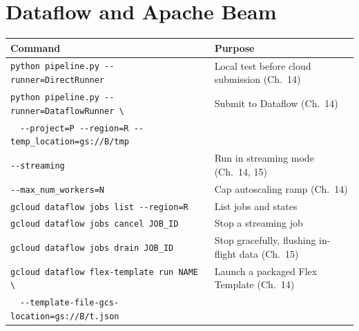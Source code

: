 \section{Dataflow and Apache Beam}
\begin{center}
\footnotesize
\begin{tabular}{@{}p{6.6cm}p{6.2cm}@{}}
\toprule
\textbf{Command} & \textbf{Purpose} \\
\midrule
\texttt{python pipeline.py -{}-runner=DirectRunner} & Local test before cloud submission (Ch.~14) \\
\texttt{python pipeline.py -{}-runner=DataflowRunner \textbackslash} & Submit to Dataflow (Ch.~14) \\
~~\texttt{-{}-project=P -{}-region=R -{}-temp\_location=gs://B/tmp} & \\
\texttt{-{}-streaming} & Run in streaming mode (Ch.~14, 15) \\
\texttt{-{}-max\_num\_workers=N} & Cap autoscaling ramp (Ch.~14) \\
\texttt{gcloud dataflow jobs list -{}-region=R} & List jobs and states \\
\texttt{gcloud dataflow jobs cancel JOB\_ID} & Stop a streaming job \\
\texttt{gcloud dataflow jobs drain JOB\_ID} & Stop gracefully, flushing in-flight data (Ch.~15) \\
\texttt{gcloud dataflow flex-template run NAME \textbackslash} & Launch a packaged Flex Template (Ch.~14) \\
~~\texttt{-{}-template-file-gcs-location=gs://B/t.json} & \\
\bottomrule
\end{tabular}
\end{center}

